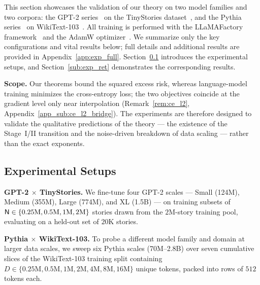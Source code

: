 \documentclass[11pt]{article}
\theoremstyle{plain}
\begin{document}
This section showcases the validation of our theory on two model families and two corpora: the GPT-2 series~\citep{bmr+20} on the TinyStories dataset~\citep{el23}, and the Pythia series~\citep{bsa+23} on WikiText-103~\citep{mxb+16}. All training is performed with the LLaMAFactory framework~\citep{zrj+24} and the AdamW optimizer~\citep{kb14}. We summarize only the key configurations and vital results below; full details and additional results are provided in Appendix~\ref{app:exp_full}. Section~\ref{sub:exp_setups} introduces the experimental setups, and Section~\ref{sub:exp_ret} demonstrates the corresponding results.

{\bf Scope.} Our theorems bound the squared excess risk, whereas language-model training minimizes the cross-entropy loss; the two objectives coincide at the gradient level only near interpolation (Remark~\ref{rem:ce_l2}, Appendix~\ref{app_sub:ce_l2_bridge}). The experiments are therefore designed to validate the qualitative predictions of the theory --- the existence of the Stage~I/II transition and the noise-driven breakdown of data scaling --- rather than the exact exponents.

\subsection{Experimental Setups}\label{sub:exp_setups}

{\bf GPT-2 $\times$ TinyStories.} We fine-tune four GPT-2 scales --- Small (124M), Medium (355M), Large (774M), and XL (1.5B) --- on training subsets of ${\sf N}\in\{0.25\text{M}, 0.5\text{M}, 1\text{M}, 2\text{M}\}$ stories drawn from the $2$M-story training pool, evaluating on a held-out set of $20$K stories.

{\bf Pythia $\times$ WikiText-103.} To probe a different model family and domain at larger data scales, we sweep six Pythia scales (70M--2.8B) over seven cumulative slices of the WikiText-103 training split containing $D\in\{0.25\text{M}, 0.5\text{M}, 1\text{M}, 2\text{M}, 4\text{M}, 8\text{M}, 16\text{M}\}$ unique tokens, packed into rows of $512$ tokens each.
\end{document}
